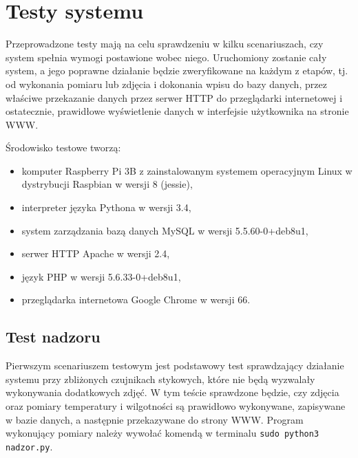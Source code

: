 \documentclass[a4paper,11pt,twoside]{article}
\begin{document}
\newpage
\section{Testy systemu}
Przeprowadzone testy mają na celu sprawdzeniu w kilku scenariuszach, czy system spełnia wymogi postawione wobec niego. Uruchomiony zostanie cały system, a jego poprawne działanie będzie zweryfikowane na każdym z etapów, tj. od wykonania pomiaru lub zdjęcia i dokonania wpisu do bazy danych, przez właściwe przekazanie danych przez serwer HTTP do przeglądarki internetowej i ostatecznie, prawidłowe wyświetlenie danych w interfejsie użytkownika na stronie WWW.

Środowisko testowe tworzą:
\begin{itemize}
\item komputer Raspberry Pi 3B z zainstalowanym systemem operacyjnym Linux w dystrybucji Raspbian w wersji 8 (jessie), 
\item interpreter języka Pythona w wersji 3.4,
\item system zarządzania bazą danych MySQL w wersji 5.5.60-0+deb8u1,
\item serwer HTTP Apache w wersji 2.4,
\item język PHP w wersji 5.6.33-0+deb8u1,
\item przeglądarka internetowa Google Chrome w wersji 66.
\end{itemize}

\subsection{Test nadzoru}
Pierwszym scenariuszem testowym jest podstawowy test sprawdzający działanie systemu przy zbliżonych czujnikach stykowych, które nie będą wyzwalały wykonywania dodatkowych zdjęć. W tym teście sprawdzone będzie, czy zdjęcia oraz pomiary temperatury i wilgotności są prawidłowo wykonywane, zapisywane w bazie danych, a następnie przekazywane do strony WWW. Program wykonujący pomiary należy wywołać komendą w terminalu \texttt{sudo python3 nadzor.py}.
\end{document}
